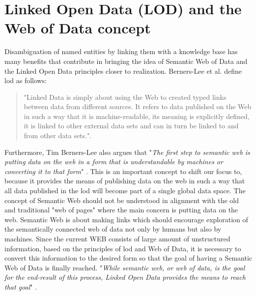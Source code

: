 \section{Linked Open Data (LOD) and the Web of Data concept}
Disambiguation of named entities by linking them with a knowledge base has many benefits that contribute in bringing the idea of Semantic Web of Data and the Linked Open Data principles closer to realization. Berners-Lee et al. \cite{lod_sofar} define \ac{lod} as follows: 

\begin{quote}
 "Linked Data is simply about using the Web to created typed links between data from different sources. It refers to data published on the Web in such a way that it is machine-readable, its meaning is explicitly defined, it is linked to other external data sets and can in turn be linked to and from other data sets.".\cite{lod_sofar}
\end{quote}

Furthermore, Tim Berners-Lee also argues that "\textit{The first step to semantic web is putting data on the web in a form that is understandable by machines or converting it to that form}" \cite{lod_sofar}. This is an important concept to shift our focus to, because it provides the means of publishing data on the web in such a way that all data published in the \ac{lod} will become part of a single global data space. The concept of Semantic Web should not be understood in alignment with the old and traditional "web of pages" where the main concern is putting data on the web. Semantic Web is about making links which should encourage exploration of the semantically connected web of data not only by humans but also by machines. Since the current WEB consists of large amount of unstructured information, based on the principles of \ac{lod} and Web of Data, it is necessary to convert this information to the desired form so that the goal of having a Semantic Web of Data is finally reached. "\textit{While semantic web, or web of data, is the goal for the end-result of this process, Linked Open Data provides the means to reach that goal}" \cite{lod_sofar}.


